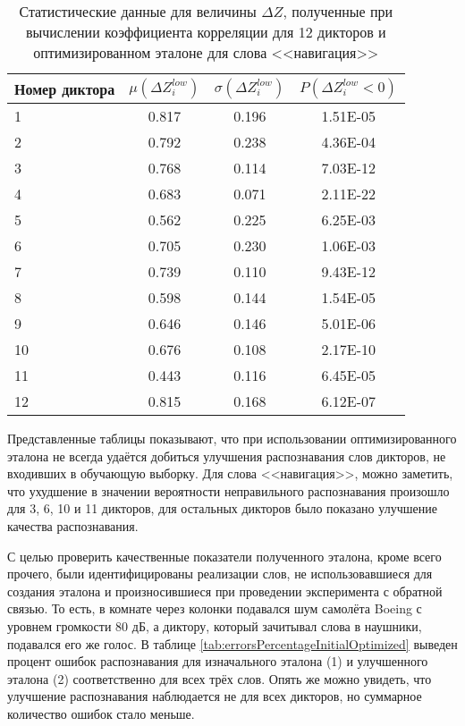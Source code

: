 \begin{table}[h]
	\centering
	\caption{Статистические данные для величины $\Delta Z$, полученные при вычислении коэффициента корреляции для 12 дикторов и оптимизированном эталоне для слова <<навигация>> }
	\label{tab:deltaZ12DictorsOptimizatioNavigation}
	\begin{tabular}{| l | c | c | c |}
		\hline
		Номер диктора & \phantom{000} $\mu(\Delta Z^{low}_{i})$ \phantom{000} & \phantom{000} $\sigma(\Delta Z^{low}_{i})$ \phantom{000} & \phantom{000} $P(\Delta Z^{low}_{i} < 0)$ \phantom{000} \\
		\hline
		1	& 0.817	& 0.196	& 1.51E-05 \\
		2	& 0.792	& 0.238	& 4.36E-04 \\
		3	& 0.768	& 0.114	& 7.03E-12 \\
		4	& 0.683	& 0.071	& 2.11E-22 \\
		5	& 0.562	& 0.225	& 6.25E-03 \\
		6	& 0.705	& 0.230	& 1.06E-03 \\
		7	& 0.739	& 0.110	& 9.43E-12 \\
		8	& 0.598	& 0.144	& 1.54E-05 \\
		9	& 0.646	& 0.146	& 5.01E-06 \\
		10	& 0.676	& 0.108	& 2.17E-10 \\
		11	& 0.443	& 0.116	& 6.45E-05 \\
		12	& 0.815	& 0.168	& 6.12E-07 \\
		\hline
	\end{tabular}
\end{table}

Представленные таблицы показывают, что при использовании оптимизированного эталона не всегда удаётся добиться улучшения распознавания слов дикторов, не входивших в обучающую выборку.
Для слова <<навигация>>, можно заметить, что ухудшение в значении вероятности неправильного распознавания произошло для 3, 6, 10 и 11 дикторов, для остальных дикторов было показано улучшение качества распознавания.

С целью проверить качественные показатели полученного эталона, кроме всего прочего, были идентифицированы реализации слов, не использовавшиеся для создания эталона и произносившиеся при проведении эксперимента с обратной связью.
То есть, в комнате через колонки подавался шум самолёта Boeing с уровнем громкости 80 дБ, а диктору, который зачитывал слова в наушники, подавался его же голос.
В таблице \ref{tab:errorsPercentageInitialOptimized} выведен процент ошибок распознавания для изначального эталона (1) и улучшенного эталона (2) соответственно для всех трёх слов.
Опять же можно увидеть, что улучшение распознавания наблюдается не для всех дикторов, но суммарное количество ошибок стало меньше.

